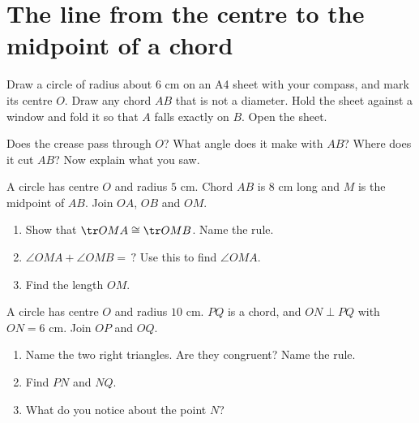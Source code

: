 \section{The line from the centre to the midpoint of a chord}

Draw a circle of radius about $6$ cm on an A4 sheet with your compass, and mark its centre $O$. Draw any chord $AB$ that is not a diameter. Hold the sheet against a window and fold it so that $A$ falls exactly on $B$. Open the sheet.

\begin{center}\end{center}

Does the crease pass through $O$? What angle does it make with $AB$? Where does it cut $AB$? Now explain what you saw.

\begin{solvefirst}
  \item A circle has centre $O$ and radius $5$ cm. Chord $AB$ is $8$ cm long and $M$ is the midpoint of $AB$. Join $OA$, $OB$ and $OM$.
  \begin{enumerate}[label=(\alph*),itemsep=1pt]
    \item Show that $\tr OMA\cong\tr OMB$. Name the rule.
    \item $\angle OMA+\angle OMB=\,?$ Use this to find $\angle OMA$.
    \item Find the length $OM$.
  \end{enumerate}
  \item A circle has centre $O$ and radius $10$ cm. $PQ$ is a chord, and $ON\perp PQ$ with $ON=6$ cm. Join $OP$ and $OQ$.
  \begin{enumerate}[label=(\alph*),itemsep=1pt]
    \item Name the two right triangles. Are they congruent? Name the rule.
    \item Find $PN$ and $NQ$.
    \item What do you notice about the point $N$?
  \end{enumerate}
\end{solvefirst}

